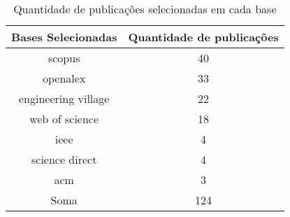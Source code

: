 \begin{table}[H]
\caption{Quantidade de publicações selecionadas em cada base}
\label{table:tertiary_review_databases}
\begin{tabular}{c|c}
\toprule
Bases Selecionadas & Quantidade de publicações \\
\midrule
scopus & 40 \\
openalex & 33 \\
engineering village & 22 \\
web of science & 18 \\
ieee & 4 \\
science direct & 4 \\
acm & 3 \\
    \hline
Soma & 124 \\
\bottomrule
\end{tabular}
\end{table}